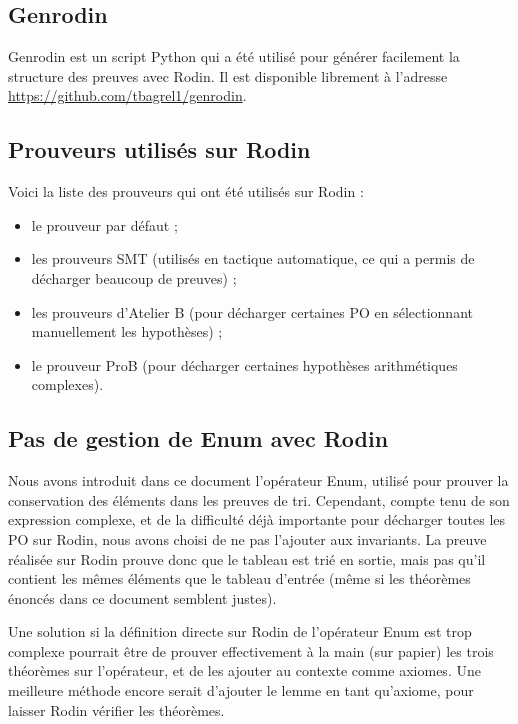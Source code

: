 \documentclass[a4paper, 11pt]{article}
\theoremstyle{mystyle}
\begin{document}
\subsection{Genrodin}

Genrodin est un script Python qui a été utilisé pour générer facilement la structure des preuves avec Rodin. Il est disponible librement à l'adresse \url{https://github.com/tbagrel1/genrodin}.

\subsection{Prouveurs utilisés sur Rodin}

Voici la liste des prouveurs qui ont été utilisés sur Rodin :
\begin{itemize}
    \item le prouveur par défaut ;
    \item les prouveurs SMT (utilisés en tactique automatique, ce qui a permis de décharger beaucoup de preuves) ;
    \item les prouveurs d'Atelier B (pour décharger certaines PO en sélectionnant manuellement les hypothèses) ;
    \item le prouveur ProB (pour décharger certaines hypothèses arithmétiques complexes).
\end{itemize}

\subsection{Pas de gestion de Enum avec Rodin}

Nous avons introduit dans ce document l'opérateur Enum, utilisé pour prouver la conservation des éléments dans les preuves de tri. Cependant, compte tenu de son expression complexe, et de la difficulté déjà importante pour décharger toutes les PO sur Rodin, nous avons choisi de ne pas l'ajouter aux invariants. La preuve réalisée sur Rodin prouve donc que le tableau est trié en sortie, mais pas qu'il contient les mêmes éléments que le tableau d'entrée (même si les théorèmes énoncés dans ce document semblent justes).

Une solution si la définition directe sur Rodin de l'opérateur Enum est trop complexe pourrait être de prouver effectivement à la main (sur papier) les trois théorèmes sur l'opérateur, et de les ajouter au contexte comme axiomes. Une meilleure méthode encore serait d'ajouter le lemme en tant qu'axiome, pour laisser Rodin vérifier les théorèmes.
\end{document}
